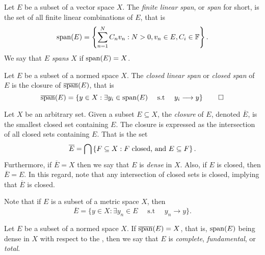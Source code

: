 \documentclass[../thesis.tex]{subfiles}
\begin{document}
\begin{definition}[Span]\label{def:span}
    Let $E$ be a subset of a vector space $X$. The \emph{finite linear span}, or \emph{span} for short, is the set of all finite linear combinations of $E$, that is
    \begin{equation*}
        \operatorname{span}(E)=\left\{\sum_{n=1}^N C_n v_n : N>0, v_n \in E, C_i \in \mathbb{F}\right\}.
    \end{equation*}
    We say that $E$ \emph{spans} $X$ if $\operatorname{span}(E) = X$.
\end{definition}


\begin{definition}\label{def:closed_span}
    Let $E$ be a subset of a normed space $X$. The \emph{closed linear span} or \emph{closed span} of $E$ is the closure of $\overline{\operatorname{span}}(E)$, that is
    \begin{equation*}
        \overline{\operatorname{span}}(E) = \left\{y\in X: \exists y_i\in \operatorname{span}(E) \quad \text{ s.t } \quad y_i \longrightarrow y\right\} \qedhere
    \end{equation*}
\end{definition}


\begin{definition}[Closure]\label{def:closure}
    Let $X$ be an arbitrary set. Given a subset $E \subseteq X$, the \emph{closure} of $E$, denoted $\overline{E}$, is the smallest closed set containing $E$. The closure is expressed as the intersection of all closed sets containing $E$. That is the set
    \begin{equation*}
        \overline{E} = \bigcap \left\{F \subseteq X : F \text{ closed, and } E \subseteq F\right\}.
    \end{equation*}
    Furthermore, if $\overline{E} = X$ then we say that $E$ is \emph{dense} in $X$. Also, if $E$ is closed, then $\overline{E}=E$. In this regard, note that any intersection of closed sets is closed, implying that $\overline{E}$ is closed.
\end{definition}
\begin{remark}
    Note that if $E$ is a subset of a metric space $X$, then
    \begin{equation*}
        \overline{E} = \{ y \in X : \exists y_n\in E \quad \text{ s.t }\quad y_n \longrightarrow y\}.
    \end{equation*}
\end{remark}

\begin{definition}[Complete]\label{def:complete}
    Let $E$ be a subset of a normed space $X$. If $\overline{\operatorname{span}}(E) = X$, that is, $\operatorname{span}(E)$ being dense in $X$ with respect to the \GenNormX, then we say that $E$ is \emph{complete}, \emph{fundamental}, or \emph{total}.
\end{definition}
\end{document}
